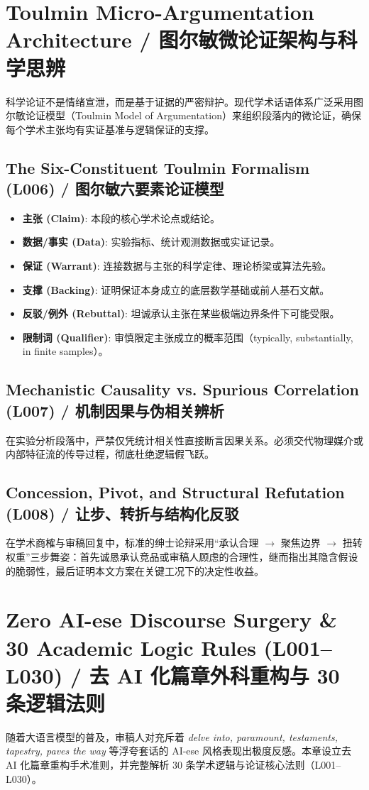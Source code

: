 \chapter{Toulmin Micro-Argumentation Architecture / 图尔敏微论证架构与科学思辨}\label{ch:toulmin}
科学论证不是情绪宣泄，而是基于证据的严密辩护。现代学术话语体系广泛采用图尔敏论证模型（Toulmin Model of Argumentation）来组织段落内的微论证，确保每个学术主张均有实证基准与逻辑保证的支撑。

\section{The Six-Constituent Toulmin Formalism (L006) / 图尔敏六要素论证模型}
\begin{itemize}[leftmargin=1.5em]
  \item \textbf{主张 (Claim)}: 本段的核心学术论点或结论。
  \item \textbf{数据/事实 (Data)}: 实验指标、统计观测数据或实证记录。
  \item \textbf{保证 (Warrant)}: 连接数据与主张的科学定律、理论桥梁或算法先验。
  \item \textbf{支撑 (Backing)}: 证明保证本身成立的底层数学基础或前人基石文献。
  \item \textbf{反驳/例外 (Rebuttal)}: 坦诚承认主张在某些极端边界条件下可能受限。
  \item \textbf{限制词 (Qualifier)}: 审慎限定主张成立的概率范围（typically, substantially, in finite samples）。
\end{itemize}

\section{Mechanistic Causality vs. Spurious Correlation (L007) / 机制因果与伪相关辨析}
在实验分析段落中，严禁仅凭统计相关性直接断言因果关系。必须交代物理媒介或内部特征流的传导过程，彻底杜绝逻辑假飞跃。

\section{Concession, Pivot, and Structural Refutation (L008) / 让步、转折与结构化反驳}
在学术商榷与审稿回复中，标准的绅士论辩采用“承认合理 $\to$ 聚焦边界 $\to$ 扭转权重”三步舞姿：首先诚恳承认竞品或审稿人顾虑的合理性，继而指出其隐含假设的脆弱性，最后证明本文方案在关键工况下的决定性收益。

\chapter{Zero AI-ese Discourse Surgery \& 30 Academic Logic Rules (L001--L030) / 去 AI 化篇章外科重构与 30 条逻辑法则}\label{ch:logic30}
随着大语言模型的普及，审稿人对充斥着 \textit{delve into, paramount, testaments, tapestry, paves the way} 等浮夸套话的 AI-ese 风格表现出极度反感。本章设立去 AI 化篇章重构手术准则，并完整解析 30 条学术逻辑与论证核心法则（L001--L030）。

